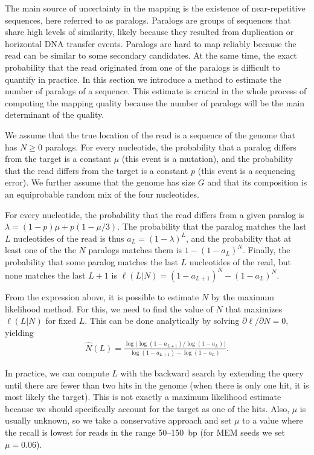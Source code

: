 \documentclass[a4,center,fleqn]{NAR}
\begin{document}
The main source of uncertainty in the mapping is the existence of
near-repetitive sequences, here referred to as paralogs. Paralogs are
groups of sequences that share high levels of similarity, likely because
they resulted from duplication or horizontal DNA transfer events. Paralogs
are hard to map reliably because the read can be similar to some secondary
candidates. At the same time, the exact probability that the read
originated from one of the paralogs is difficult to quantify in practice.
In this section we introduce a method to estimate the number of paralogs
of a sequence. This estimate is crucial in the whole process of computing
the mapping quality because the number of paralogs will be the main
determinant of the quality.

We assume that the true location of the read is a sequence of the genome
that has $N \geq 0$ paralogs. For every nucleotide, the probability that a
paralog differs from the target is a constant $\mu$ (this event is a
mutation), and the probability that the read differs from the target is a
constant $p$ (this event is a sequencing error). We further assume that
the genome has size $G$ and that its composition is an equiprobable random
mix of the four nucleotides.

For every nucleotide, the probability that the read differs from a given
paralog is $\lambda = (1-p)\mu + p(1-\mu/3)$. The probability that the
paralog matches the last $L$ nucleotides of the read is thus $a_L =
(1-\lambda)^L$, and the probability that at least one of the the $N$
paralogs matches them is $1-(1-a_L)^N$. Finally, the probability that
some paralog matches the last $L$ nucleotides of the read, but none
matches the last $L+1$ is $\ell(L|N) = (1-a_{L+1})^N-(1-a_L)^N.$

From the expression above, it is possible to estimate $N$ by the maximum
likelihood method. For this, we need to find the value of $N$ that
maximizes $\ell(L|N)$ for fixed $L$. This can be done analytically by
solving $\partial \ell / \partial N = 0$, yielding
\begin{align}
\label{eq_mle}
\hat{N}(L) =\frac{ \log \big( \log(1-a_{L+1}) / \log(1-a_L) \big)} {
\log(1-a_{L+1}) - \log(1-a_L) }.
\end{align}

In practice, we can compute $L$ with the backward search by extending the
query until there are fewer than two hits in the genome (when there is
only one hit, it is most likely the target). This is not exactly a maximum
likelihood estimate because we should specifically account for the target
as one of the hits. Also, $\mu$ is usually unknown, so we take a
conservative approach and set $\mu$ to a value where the recall is lowest
for reads in the range 50--150~bp (for MEM seeds we set $\mu = 0.06$).
\end{document}
